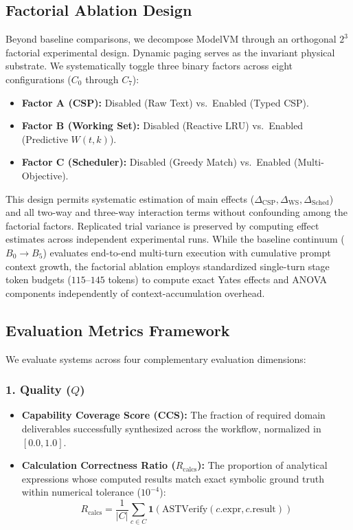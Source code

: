 \subsection{Factorial Ablation Design}
\label{sec:factorial_design}

Beyond baseline comparisons, we decompose ModelVM through an orthogonal $2^3$ factorial experimental design. Dynamic paging serves as the invariant physical substrate. We systematically toggle three binary factors across eight configurations ($C_0$ through $C_7$):
\begin{itemize}
    \item \textbf{Factor A (CSP):} Disabled (Raw Text) vs.\ Enabled (Typed CSP).
    \item \textbf{Factor B (Working Set):} Disabled (Reactive LRU) vs.\ Enabled (Predictive $W(t, k)$).
    \item \textbf{Factor C (Scheduler):} Disabled (Greedy Match) vs.\ Enabled (Multi-Objective).
\end{itemize}
This design permits systematic estimation of main effects ($\Delta_{\text{CSP}}, \Delta_{\text{WS}}, \Delta_{\text{Sched}}$) and all two-way and three-way interaction terms without confounding among the factorial factors. Replicated trial variance is preserved by computing effect estimates across independent experimental runs. While the baseline continuum ($B_0 \to B_5$) evaluates end-to-end multi-turn execution with cumulative prompt context growth, the factorial ablation employs standardized single-turn stage token budgets ($115\text{--}145$ tokens) to compute exact Yates effects and ANOVA components independently of context-accumulation overhead.

\subsection{Evaluation Metrics Framework}
\label{sec:metrics}

We evaluate systems across four complementary evaluation dimensions:

\subsubsection{1. Quality (\texorpdfstring{$Q$}{Q})}
\begin{itemize}
    \item \textbf{Capability Coverage Score (CCS):} The fraction of required domain deliverables successfully synthesized across the workflow, normalized in $[0.0, 1.0]$.
    \item \textbf{Calculation Correctness Ratio ($R_{\text{calcs}}$):} The proportion of analytical expressions whose computed results match exact symbolic ground truth within numerical tolerance ($10^{-4}$):
    \begin{equation}
    R_{\text{calcs}} = \frac{1}{|C|} \sum_{c \in C} \mathbf{1}\left( \text{ASTVerify}(c.\text{expr}, c.\text{result}) \right)
    \end{equation}
\end{itemize}

